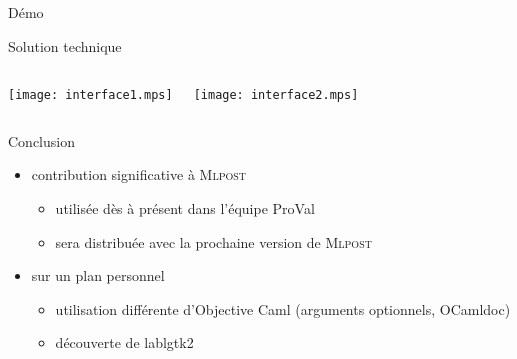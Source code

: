 \documentclass{beamer}
\newcommand{\mlpost}{\textsc{Mlpost}}
\begin{document}
\begin{frame}{Démo}
  
\end{frame}


\begin{frame}{Solution technique}
  \begin{columns}
    \begin{center}
      \texttt{[image: interface1.mps]}
    \end{center}
    \begin{center}
      \texttt{[image: interface2.mps]}
    \end{center}
  \end{columns}
\end{frame}

\begin{frame}{Conclusion}
  \begin{itemize}
  \item contribution significative à \mlpost
    \begin{itemize}
    \item<1-> utilisée dès à présent dans l'équipe ProVal
    \item<2-> sera distribuée avec la prochaine version de \mlpost
    \end{itemize}
    
    \bigskip
  \item<3-> sur un plan personnel
    \begin{itemize}
    \item<3-> utilisation différente d'Objective Caml (arguments optionnels, OCamldoc)
    \item<4-> découverte de lablgtk2
    \end{itemize}
  \end{itemize}
\end{frame}
\end{document}
